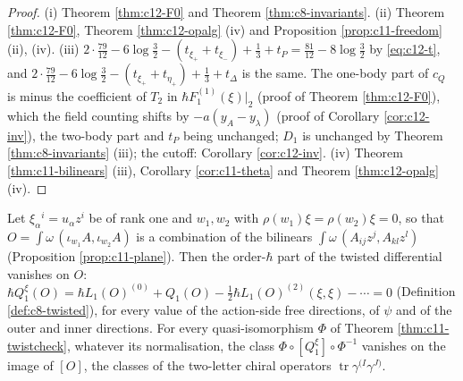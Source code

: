 \begin{proof}
(i) Theorem \ref{thm:c12-F0} and Theorem \ref{thm:c8-invariants}. (ii) Theorem \ref{thm:c12-F0}, Theorem \ref{thm:c12-opalg} (iv) and Proposition \ref{prop:c11-freedom} (ii), (iv). (iii) $2\cdot\tfrac{79}{12}-6\log\tfrac32-(t_{\xi_+}+t_{\xi_-})+\tfrac13+t_P=\tfrac{81}{12}-8\log\tfrac32$ by \eqref{eq:c12-t}, and $2\cdot\tfrac{79}{12}-6\log\tfrac32-(t_{\xi_+}+t_{\eta_+})+\tfrac13+t_\Delta$ is the same. The one-body part of $c_Q$ is minus the coefficient of $T_2$ in $\hbar F_1^{(1)}(\xi)|_2$ (proof of Theorem \ref{thm:c12-F0}), which the field counting shifts by $-a(y_A-y_\lambda)$ (proof of Corollary \ref{cor:c12-inv}), the two-body part and $t_P$ being unchanged; $D_1$ is unchanged by Theorem \ref{thm:c8-invariants} (iii); the cutoff: Corollary \ref{cor:c12-inv}. (iv) Theorem \ref{thm:c11-bilinears} (iii), Corollary \ref{cor:c11-theta} and Theorem \ref{thm:c12-opalg} (iv).
\end{proof}

\begin{proposition}
\label{prop:c12-twist}
Let $\xi_\alpha{}^i=u_\alpha z^i$ be of rank one and $w_1,w_2$ with $\rho(w_1)\xi=\rho(w_2)\xi=0$, so that $O=\int\omega\,(\iota_{w_1}A,\iota_{w_2}A)$ is a combination of the bilinears $\int\omega\,(A_{ij}z^j,A_{kl}z^l)$ (Proposition \ref{prop:c11-plane}). Then the order-$\hbar$ part of the twisted differential vanishes on $O$: $\hbar Q^\xi_1(O)=\hbar L_1(O)^{(0)}+Q_1(O)-\tfrac12\hbar L_1(O)^{(2)}(\xi,\xi)-\cdots=0$ (Definition \ref{def:c8-twisted}), for every value of the action-side free directions, of $\psi$ and of the outer and inner directions. For every quasi-isomorphism $\Phi$ of Theorem \ref{thm:c11-twistcheck}, whatever its normalisation, the class $\Phi\circ[Q^\xi_1]\circ\Phi^{-1}$ vanishes on the image of $[O]$, the classes of the two-letter chiral operators $\operatorname{tr}\gamma^{(I}\gamma^{J)}$.
\end{proposition}

